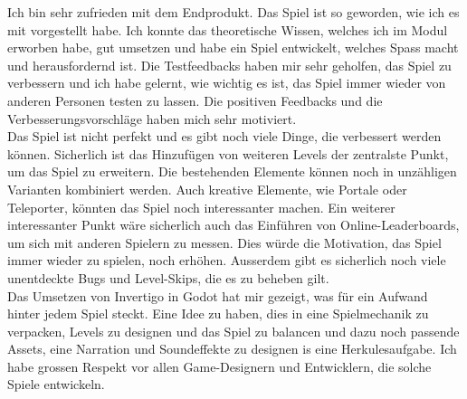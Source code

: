 \documentclass{article}
\begin{document}
Ich bin sehr zufrieden mit dem Endprodukt. Das Spiel ist so geworden, wie ich es mit vorgestellt habe. Ich konnte das theoretische Wissen, welches ich im Modul erworben habe, gut umsetzen und
habe ein Spiel entwickelt, welches Spass macht und herausfordernd ist. Die Testfeedbacks haben mir sehr geholfen, das Spiel zu verbessern und ich habe gelernt, wie wichtig es ist, das Spiel immer wieder
von anderen Personen testen zu lassen. Die positiven Feedbacks und die Verbesserungsvorschläge haben mich sehr motiviert.
\\
Das Spiel ist nicht perfekt und es gibt noch viele Dinge, die verbessert werden können. Sicherlich ist das Hinzufügen von weiteren Levels der zentralste Punkt, um das Spiel zu erweitern. Die bestehenden
Elemente können noch in unzähligen Varianten kombiniert werden. Auch kreative Elemente, wie Portale oder Teleporter, könnten das Spiel noch interessanter machen. Ein weiterer interessanter Punkt wäre sicherlich auch
das Einführen von Online-Leaderboards, um sich mit anderen Spielern zu messen. Dies würde die Motivation, das Spiel immer wieder zu spielen, noch erhöhen.
Ausserdem gibt es sicherlich noch viele unentdeckte Bugs und Level-Skips, die es zu beheben gilt.
\\
Das Umsetzen von Invertigo in Godot hat mir gezeigt, was für ein Aufwand hinter jedem Spiel steckt. Eine Idee zu haben, dies in eine Spielmechanik zu verpacken, Levels zu designen und das Spiel zu balancen
und dazu noch passende Assets, eine Narration und Soundeffekte zu designen is eine Herkulesaufgabe. Ich habe grossen Respekt vor allen Game-Designern und Entwicklern, die solche Spiele entwickeln.
\end{document}
